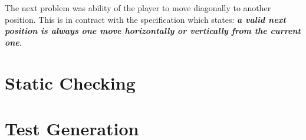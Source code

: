 \documentclass[a4paper]{article}
\begin{document}
The next problem was ability of the player to move diagonally to another position. This is in contract with the specification which states: \textbf{\textit{a valid next position is always one move horizontally or vertically from the current one}}.

\section{Static Checking}


\section{Test Generation}
\end{document}
